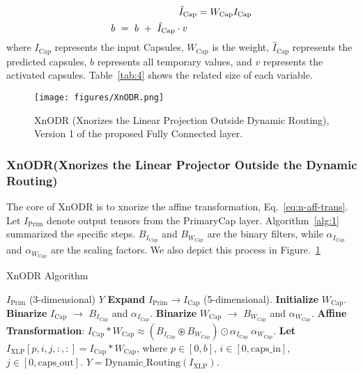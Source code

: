 \documentclass[sn-mathphys,iicol,Numbered]{sn-jnl}
\begin{document}
\vspace{-0.3cm}
\begin{align}\tiny \label{eq:n-aff-trans}
\hat{I}_{\text{Cap}} &= W_{\text{Cap}}I_{\text{Cap}} \\
\begin{split} \label{eq:n-tmprry-val}
b\ &=\ b\ +\ \hat{I}_{\text{Cap}}\cdot v
\end{split}
\end{align}
where $I_{\text{Cap}}$ represents the input Capsules, $W_{\text{Cap}}$ is the weight, $\hat{I}_{\text{Cap}}$ represents the predicted capsules, $b$ represents all temporary values, and $v$ represents the activated capsules. Table~\ref{tab:4} shows the related size of each variable.

\begin{figure} [ht]
\centering
\caption{XnODR (Xnorizes the Linear Projection Outside Dynamic Routing), Version 1 of the proposed Fully Connected layer.}
\texttt{[image: figures/XnODR.png]}
\label{fig:XnODR}
\vspace{-0.7cm}
\end{figure}

\subsubsection{XnODR(Xnorizes the Linear Projector Outside the Dynamic Routing)} \label{sec:3.3.1} 

The core of XnODR is to xnorize the affine transformation, Eq.~\ref{eq:n-aff-trans}. Let $I_{\text{Prim}}$ denote output tensors from the PrimaryCap layer. Algorithm~\ref{alg:1} summarized the specific steps. $B_{I_{\text{Cap}}}$ and $B_{W_{\text{Cap}}}$ are the binary filters, while $\alpha_{I_{\text{Cap}}}$ and $\alpha_{W_{\text{Cap}}}$ are the scaling factors. We also depict this process in Figure.~\ref{fig:XnODR}

\begin{algorithm}[ht]\small
\caption{XnODR Algorithm}
\begin{algorithmic}[1]
\INPUT $I_{\text{Prim}}$ (3-dimensional)
\OUTPUT $Y$
\State  \textbf{Expand} $I_{\text{Prim}} \rightarrow I_{\text{Cap}}$ (5-dimensional).
\State \textbf{Initialize} $W_{\text{Cap}}$.
\State \textbf{Binarize} $I_{\text{Cap}}$ $\rightarrow$ $B_{I_{\text{Cap}}}$ and $\alpha_{I_{\text{Cap}}}$.
\State \textbf{Binarize} $W_{\text{Cap}}$ $\rightarrow$ $B_{W_{\text{Cap}}}$ and $\alpha_{W_{\text{Cap}}}$. 
\State \textbf{Affine Transformation}:
$I_{\text{Cap}}* W_{\text{Cap}} \approx (B_{I_{\text{Cap}}}\circledast B_{W_{\text{Cap}}})\odot \alpha_{I_{\text{Cap}}}\ \alpha_{W_{\text{Cap}}}$.
\State \textbf{Let} $I_{\text{XLP}}[p,i,j,:,:] = I_{\text{Cap}}* W_{\text{Cap}}$, where $p\in[0,b]$, $i\in[0, \text{caps\_in}]$, $j\in[0, \text{caps\_out}]$. 
\State $Y = \text{Dynamic\_Routing}(I_{\text{XLP}})$.
\end{algorithmic}
\label{alg:1}
\end{algorithm}
\end{document}
